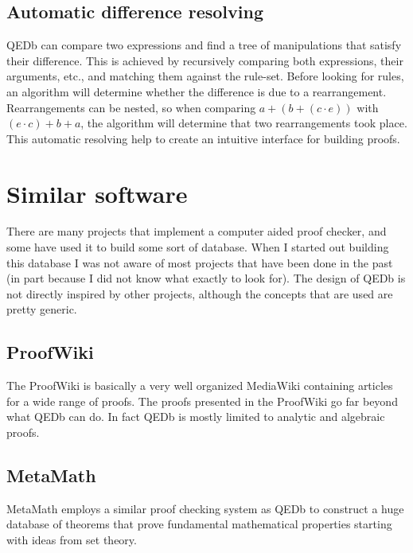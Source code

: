 \documentclass{article}
\begin{document}
\subsection{Automatic difference resolving}
\label{section:difference-resolving}
QEDb can compare two expressions and find a tree of manipulations that satisfy their difference. This is achieved by recursively comparing both expressions, their arguments, etc., and matching them against the rule-set. Before looking for rules, an algorithm will determine whether the difference is due to a rearrangement. Rearrangements can be nested, so when comparing $a+(b+(c\cdot e))$ with $(e\cdot c)+b+a$, the algorithm will determine that two rearrangements took place. This automatic resolving help to create an intuitive interface for building proofs.

\section{Similar software}
There are many projects that implement a computer aided proof checker, and some have used it to build some sort of database. When I started out building this database I was not aware of most projects that have been done in the past (in part because I did not know what exactly to look for). The design of QEDb is not directly inspired by other projects, although the concepts that are used are pretty generic.

\subsection{ProofWiki}
The ProofWiki is basically a very well organized MediaWiki containing articles for a wide range of proofs. The proofs presented in the ProofWiki go far beyond what QEDb can do. In fact QEDb is mostly limited to analytic and algebraic proofs.

\subsection{MetaMath}
MetaMath employs a similar proof checking system as QEDb to construct a huge database of theorems that prove fundamental mathematical properties starting with ideas from set theory.
\end{document}
